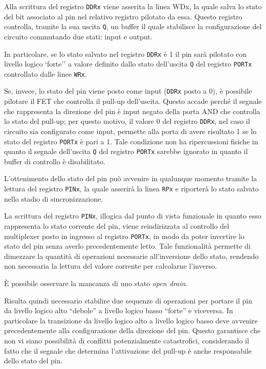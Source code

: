 Alla scrittura del registro \texttt{DDRx} viene asserita la linea WDx, la quale salva lo stato del bit associato al pin nel relativo registro pilotato da essa. Questo registro controlla, tramite la sua uscita \texttt{Q}, un buffer il quale stabilisce la  configurazione del circuito commutando due stati: input e output.

In particolare, se lo stato salvato nel registro \texttt{DDRx} è 1 il pin sarà pilotato con livello logico `forte'' a valore definito dallo stato dell'uscita \texttt{Q} del registro \texttt{PORTx} controllato dalle linee \texttt{WRx}.

Se, invece, lo stato del pin viene posto come input (\texttt{DDRx} posto a 0), è possibile pilotare il FET che controlla il pull-up dell'uscita. Questo accade perché il segnale che rappresenta la direzione del pin è input negato della porta AND che controlla lo stato del pull-up; per questo motivo, il valore 0 del registro \texttt{DDRx}, nel caso il circuito sia configurato come input, permette alla porta di avere risultato 1 se lo stato del registro \texttt{PORTx} è pari a 1.
Tale condizione non ha ripercussioni fisiche in quanto il segnale dell'uscita \texttt{Q} del registro \texttt{PORTx} sarebbe ignorato in quanto il buffer di controllo è disabilitato.

L'ottenimento dello stato del pin può avvenire in qualunque momento tramite la lettura del registro \texttt{PINx}, la quale asserirà la linea \texttt{RPx} e riporterà lo stato salvato nello stadio di sincronizzazione.

La scrittura del registro \texttt{PINx}, illogica dal punto di vista funzionale in quanto esso rappresenta lo stato corrente del pin, viene reindirizzata al controllo del multiplexer posto in ingresso al registro \texttt{PORTx}, in modo da poter invertire lo stato del pin senza averlo precedentemente letto.
Tale funzionalità permette di dimezzare la quantità di operazioni necessarie all'inversione dello stato, rendendo non necessaria la lettura del valore corrente per calcolarne l'inverso.

È possibile osservare la mancanza di uno stato \textit{open drain}.

Risulta quindi necessario stabilire due sequenze di operazioni per portare il pin da livello logico alto ``debole'' a livello logico basso ``forte'' e viceversa. In particolare la transizione da livello logico alto a livello logico basso deve avvenire precedentemente alla configurazione della direzione del pin. Questo garantisce che non vi siano possibilità di conflitti potenzialmente catastrofici, considerando il fatto che il segnale che determina l'attivazione del pull-up è anche responsabile dello stato del pin.

